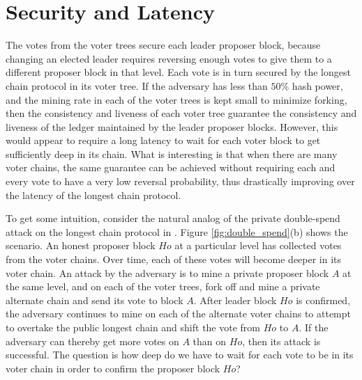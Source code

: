 \fi

\section{Security and Latency}
\label{sec:prism-latency}


The votes from the voter trees secure each leader proposer block, because changing an elected leader requires reversing enough votes to give them to a different proposer block in that level. 
Each vote is in turn secured by the longest chain protocol in its voter tree. If the adversary has less than $50\%$ hash power, and the mining rate in each of the voter trees is kept small to minimize forking,  then the consistency and liveness of each voter tree guarantee the consistency and liveness of the ledger maintained by the leader proposer blocks. 
However, this would appear to require a long latency to wait for each voter block to get sufficiently deep in its chain. What is interesting is that when there are many voter chains, the same guarantee can be achieved without requiring each and every vote to have a very low reversal probability, thus drastically improving over the latency of the longest chain protocol. 


To get some intuition, consider the natural analog of the private double-spend attack on the longest chain protocol in \prism. Figure \ref{fig:double_spend}(b) shows the scenario. An honest proposer block $Ho$ at a particular level has collected votes from the voter chains. Over time, each of these votes will become deeper in its voter chain. An attack by the adversary is to mine a private proposer block $A$ at the same level, and on each of the voter trees, fork off and mine a private alternate chain and send its vote to block $A$. After leader block $Ho$ is confirmed, the adversary continues to mine on each of the alternate voter chains to attempt to overtake the public longest chain and shift the vote from $Ho$ to $A$. If the adversary can thereby get more votes on $A$ than on $Ho$, then its attack is successful. The question is how deep do we have to wait for each vote to be in its voter chain in order to confirm the proposer block $Ho$?

